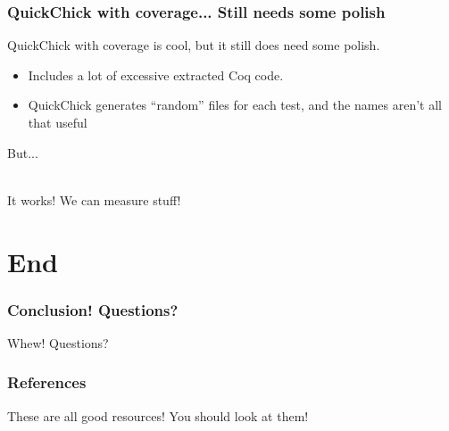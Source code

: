 \documentclass{beamer}
\begin{document}
\begin{frame}
  \frametitle{QuickChick with coverage... Still needs some polish}

  QuickChick with coverage is cool, but it still does need some
  polish.\\

  \begin{itemize}
    \pause
  \item Includes a lot of excessive extracted Coq code.
    \pause
  \item QuickChick generates ``random'' files for each test, and the
    names aren't all that useful
  \end{itemize}

  \pause

  But...\\~\\

  \pause

  {\huge It works! We can measure stuff!}
\end{frame}

\section{End}

\begin{frame}
  \frametitle{Conclusion! Questions?}

  \huge{Whew! Questions?}
\end{frame}

\begin{frame}
  \frametitle{References}

  \nocite{*}
  \printbibliography

  These are all good resources! You should look at them!
\end{frame}
\end{document}

